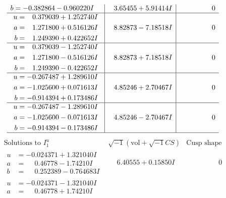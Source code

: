 \documentclass[1p]{elsarticle_modified}
\theoremstyle{definition}
\newcommand{\I}{\sqrt{-1}}
\begin{document}
$$\begin{array}{c|c|c}
\begin{aligned}
b &= -0.382864 - 0.960220 I\end{aligned}
 & \phantom{-}3.65455 + 5.91414 I & \phantom{-0.000000 } 0 \\ \hline\begin{aligned}
u &= \phantom{-}0.379039 + 1.252740 I \\
a &= \phantom{-}1.271800 + 0.516126 I \\
b &= \phantom{-}1.249390 + 0.422652 I\end{aligned}
 & \phantom{-}8.82873 - 7.18518 I & \phantom{-0.000000 } 0 \\ \hline\begin{aligned}
u &= \phantom{-}0.379039 - 1.252740 I \\
a &= \phantom{-}1.271800 - 0.516126 I \\
b &= \phantom{-}1.249390 - 0.422652 I\end{aligned}
 & \phantom{-}8.82873 + 7.18518 I & \phantom{-0.000000 } 0 \\ \hline\begin{aligned}
u &= -0.267487 + 1.289610 I \\
a &= -1.025600 + 0.071613 I \\
b &= -0.914394 + 0.173486 I\end{aligned}
 & \phantom{-}4.85246 + 2.70467 I & \phantom{-0.000000 } 0 \\ \hline\begin{aligned}
u &= -0.267487 - 1.289610 I \\
a &= -1.025600 - 0.071613 I \\
b &= -0.914394 - 0.173486 I\end{aligned}
 & \phantom{-}4.85246 - 2.70467 I & \phantom{-0.000000 } 0\\
 \hline 
 \end{array}$$\newpage$$\begin{array}{c|c|c}  
\text{Solutions to }I^u_{1}& \I (\text{vol} + \sqrt{-1}CS) & \text{Cusp shape}\\
 \hline 
\begin{aligned}
u &= -0.024371 + 1.321040 I \\
a &= \phantom{-}0.46778 - 1.74210 I \\
b &= \phantom{-}0.252389 - 0.764683 I\end{aligned}
 & \phantom{-}6.40555 + 0.15850 I & \phantom{-0.000000 } 0 \\ \hline\begin{aligned}
u &= -0.024371 - 1.321040 I \\
a &= \phantom{-}0.46778 + 1.74210 I \\

\end{aligned}
\end{array}$$
\end{document}
